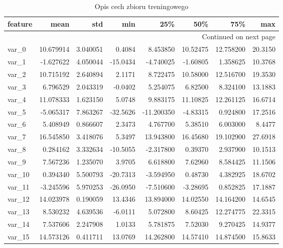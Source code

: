 ﻿\documentclass[12pt]{article}
\begin{document}
\begin{longtable}{lrrrrrrr}
\toprule
 feature &       mean &        std &      min &        25\% &       50\% &        75\% &      max \\
\midrule
\endhead
\midrule
\multicolumn{8}{r}{{Continued on next page}} \\
\midrule
\caption{Opis cech zbioru treningowego}
\label{traindescribe}
\endfoot

\bottomrule
\endlastfoot
   var\_0 &  10.679914 &   3.040051 &   0.4084 &   8.453850 &  10.52475 &  12.758200 &  20.3150 \\
   var\_1 &  -1.627622 &   4.050044 & -15.0434 &  -4.740025 &  -1.60805 &   1.358625 &  10.3768 \\
   var\_2 &  10.715192 &   2.640894 &   2.1171 &   8.722475 &  10.58000 &  12.516700 &  19.3530 \\
   var\_3 &   6.796529 &   2.043319 &  -0.0402 &   5.254075 &   6.82500 &   8.324100 &  13.1883 \\
   var\_4 &  11.078333 &   1.623150 &   5.0748 &   9.883175 &  11.10825 &  12.261125 &  16.6714 \\
   var\_5 &  -5.065317 &   7.863267 & -32.5626 & -11.200350 &  -4.83315 &   0.924800 &  17.2516 \\
   var\_6 &   5.408949 &   0.866607 &   2.3473 &   4.767700 &   5.38510 &   6.003000 &   8.4477 \\
   var\_7 &  16.545850 &   3.418076 &   5.3497 &  13.943800 &  16.45680 &  19.102900 &  27.6918 \\
   var\_8 &   0.284162 &   3.332634 & -10.5055 &  -2.317800 &   0.39370 &   2.937900 &  10.1513 \\
   var\_9 &   7.567236 &   1.235070 &   3.9705 &   6.618800 &   7.62960 &   8.584425 &  11.1506 \\
  var\_10 &   0.394340 &   5.500793 & -20.7313 &  -3.594950 &   0.48730 &   4.382925 &  18.6702 \\
  var\_11 &  -3.245596 &   5.970253 & -26.0950 &  -7.510600 &  -3.28695 &   0.852825 &  17.1887 \\
  var\_12 &  14.023978 &   0.190059 &  13.4346 &  13.894000 &  14.02550 &  14.164200 &  14.6545 \\
  var\_13 &   8.530232 &   4.639536 &  -6.0111 &   5.072800 &   8.60425 &  12.274775 &  22.3315 \\
  var\_14 &   7.537606 &   2.247908 &   1.0133 &   5.781875 &   7.52030 &   9.270425 &  14.9377 \\
  var\_15 &  14.573126 &   0.411711 &  13.0769 &  14.262800 &  14.57410 &  14.874500 &  15.8633 \\

\end{longtable}
\end{document}
